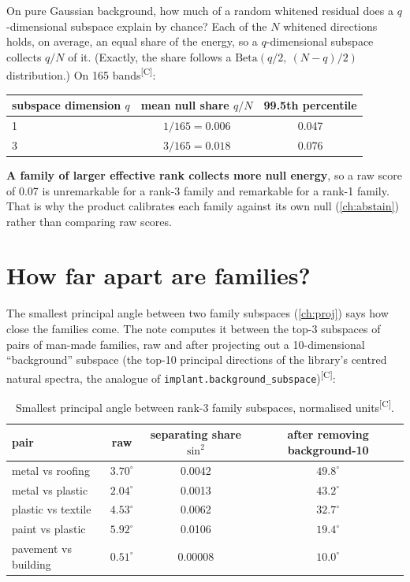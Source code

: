 \documentclass[11pt,a4paper,oneside,openany]{book}
\newcommand{\comp}{\textsuperscript{\textsf{\scriptsize[C]}}}
\begin{document}
On pure Gaussian background, how much of a random whitened residual does a $q$-dimensional subspace explain by chance? Each of the $N$ whitened
directions holds, on average, an equal share of the energy, so a $q$-dimensional subspace collects $q/N$ of it. (Exactly, the share follows a
$\mathrm{Beta}(q/2,\ (N-q)/2)$ distribution.) On 165 bands\comp:

\begin{center}
\begin{tabular}{@{}lcc@{}}
\toprule
subspace dimension $q$ & mean null share $q/N$ & 99.5th percentile\\
\midrule
1 & $1/165=0.006$ & 0.047\\
3 & $3/165=0.018$ & 0.076\\
\bottomrule
\end{tabular}
\end{center}

\textbf{A family of larger effective rank collects more null energy}, so a raw score of 0.07 is unremarkable for a rank-3 family and remarkable for a
rank-1 family. That is why the product calibrates each family against its own null (\cref{ch:abstain}) rather than comparing raw scores.

\section{How far apart are families?}

The smallest principal angle between two family subspaces (\cref{ch:proj}) says how close the families come. The note computes it between the
top-3 subspaces of pairs of man-made families, raw and after projecting out a 10-dimensional ``background'' subspace (the top-10 principal directions
of the library's centred natural spectra, the analogue of \texttt{implant.background\_subspace})\comp:

\begin{table}[ht]
\centering\small
\caption{Smallest principal angle between rank-3 family subspaces, normalised units\comp.}
\label{tab:angles}
\begin{tabular}{@{}lccc@{}}
\toprule
pair & raw & separating share $\sin^2$ & after removing background-10\\
\midrule
metal vs roofing & $3.70^\circ$ & 0.0042 & $49.8^\circ$\\
metal vs plastic & $2.04^\circ$ & 0.0013 & $43.2^\circ$\\
plastic vs textile & $4.53^\circ$ & 0.0062 & $32.7^\circ$\\
paint vs plastic & $5.92^\circ$ & 0.0106 & $19.4^\circ$\\
pavement vs building & $0.51^\circ$ & 0.00008 & $10.0^\circ$\\
\bottomrule
\end{tabular}
\end{table}
\end{document}
